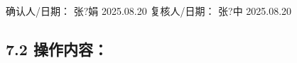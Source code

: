 \documentclass[UTF8,10pt,a4paper,fontset=fandol]{ctexart}
\newcommand{\fieldvalue}[1]{#1}
\newcommand{\handwritten}[1]{#1}
\begin{document}
\vspace{0.3em}

确认人/日期：
\fieldvalue{\handwritten{张?娟}}
\quad
\fieldvalue{\handwritten{2025.08.20}}
\hfill
复核人/日期：
\fieldvalue{\handwritten{张?中}}
\quad
\fieldvalue{\handwritten{2025.08.20}}

\subsection*{7.2 操作内容：}
\end{document}
